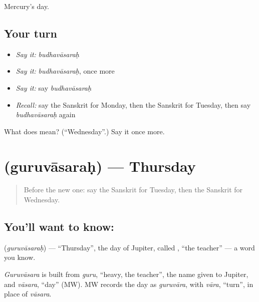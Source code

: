 \begin{grammarlens}[title={What you've built}]
Mercury's day.
\end{grammarlens}

\subsection*{Your turn}
\begin{itemize}
\raggedright
  \item \emph{Say it:} \emph{budhavāsaraḥ}
  \item \emph{Say it:} \emph{budhavāsaraḥ}, once more
  \item \emph{Say it:} say \emph{budhavāsaraḥ}
  \item \emph{Recall:} say the Sanskrit for Monday, then the Sanskrit for Tuesday, then say \emph{budhavāsaraḥ} again
\end{itemize}

\begin{tcolorbox}[breakable,colback=teal!4,colframe=teal!35!black,title={Before you move on}]
What does  mean? (\textquotedblleft{}Wednesday\textquotedblright{}.) Say it once more.
\end{tcolorbox}
\section[\texorpdfstring{\sk{गुरुवासरः} (guruvāsaraḥ)}{गुरुवासरः (guruvāsaraḥ)}]{ (guruvāsaraḥ) — Thursday}

\label{lesson:SA-C85-thursday}



\begin{quote}
Before the new one: say the Sanskrit for Tuesday, then the Sanskrit for Wednesday.
\end{quote}

\subsection*{You'll want to know: }
\textbf{} (\emph{guruvāsaraḥ}) — \textquotedblleft{}Thursday\textquotedblright{}, the day of Jupiter, called \textbf{}, \textquotedblleft{}the teacher\textquotedblright{} — a word you know.

\begin{cousinweb}
\emph{Guruvāsara} is built from \emph{guru}, \textquotedblleft{}heavy, the teacher\textquotedblright{}, the name given to Jupiter, and \emph{vāsara}, \textquotedblleft{}day\textquotedblright{} (MW). MW records the day as \emph{guruvāra}, with \emph{vāra}, \textquotedblleft{}turn\textquotedblright{}, in place of \emph{vāsara}.
\end{cousinweb}

